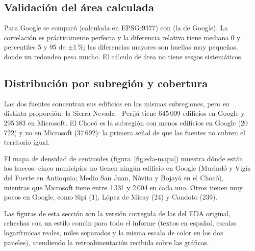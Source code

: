 \subsection{Validación del área calculada}

Para Google se comparó  (calculada en EPSG:9377) con
 (la de Google). La correlación es prácticamente
perfecta y la diferencia relativa tiene mediana 0 y percentiles 5 y 95 de
$\pm$1\,\%; las diferencias mayores son huellas muy pequeñas, donde un redondeo
pesa mucho. El cálculo de área no tiene sesgos sistemáticos.


\subsection{Distribución por subregión y cobertura}

Las dos fuentes concentran sus edificios en las mismas subregiones, pero en
distinta proporción: la Sierra Nevada - Perijá tiene 645\,009 edificios en
Google y 295\,383 en Microsoft. El Chocó es la subregión con menos edificios en
Google (20\,722) y no en Microsoft (37\,692): la primera señal de que las
fuentes no cubren el territorio igual.


El mapa de densidad de centroides (figura~\ref{fig:eda-mapa}) muestra dónde
están los huecos: cinco municipios no tienen ningún edificio en Google
(Murindó y Vigía del Fuerte en Antioquia; Medio San Juan, Nóvita y Bojayá en el
Chocó), mientras que Microsoft tiene entre 1\,331 y 2\,004 en cada uno. Otros
tienen muy pocos en Google, como Sipí (1), López de Micay (24) y Condoto (239).


Las figuras de esta sección son la versión corregida de las del EDA original,
rehechas con un estilo común para todo el informe (textos en español, escalas
logarítmicas reales, miles separados y la misma escala de color en los dos
paneles), atendiendo la retroalimentación recibida sobre las gráficas.
